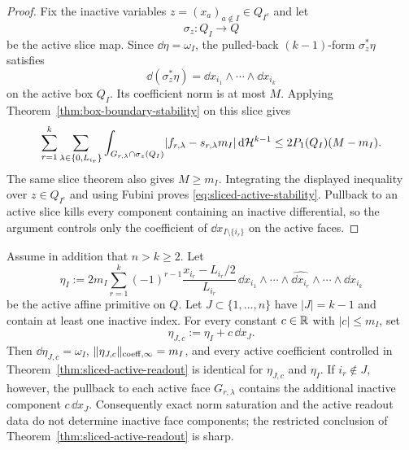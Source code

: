 \begin{proof}
Fix the inactive variables $z=(x_a)_{a\notin I}\in Q_{I^c}$ and let
\[
\sigma_z:Q_I\to Q
\]
be the active slice map. Since $\dd\eta=\omega_I$, the pulled-back
$(k-1)$-form $\sigma_z^\ast\eta$ satisfies
\[
\dd(\sigma_z^\ast\eta)=\dd x_{i_1}\wedge\cdots\wedge\dd x_{i_k}
\]
on the active box $Q_I$. Its coefficient norm is at most $M$. Applying
Theorem~\ref{thm:box-boundary-stability} on this slice gives
\[
\sum_{r=1}^k\sum_{\lambda\in\{0,L_{i_r}\}}
\int_{G_{r,\lambda}\cap\sigma_z(Q_I)}
\lvert f_{r,\lambda}-s_{r,\lambda}m_I \rvert\,\mathrm{d}\mathcal{H}^{k-1}
\le
2P_1(Q_I)(M-m_I).
\]
The same slice theorem also gives $M\ge m_I$. Integrating the displayed
inequality over $z\in Q_{I^c}$ and using Fubini proves
\eqref{eq:sliced-active-stability}. Pullback to an active slice kills every
component containing an inactive differential, so the argument controls only
the coefficient of $\dd x_{I\setminus\{i_r\}}$ on the active faces.
\end{proof}

\begin{proposition}
\label{prop:inactive-face-invisibility}
Assume in addition that $n>k\ge2$. Let
\[
\eta_I:=2m_I\sum_{r=1}^k(-1)^{r-1}
\frac{x_{i_r}-L_{i_r}/2}{L_{i_r}}\,
\dd x_{i_1}\wedge\cdots\wedge\widehat{\dd x_{i_r}}\wedge\cdots
\wedge\dd x_{i_k}
\]
be the active affine primitive on $Q$. Let $J\subset\{1,\dots,n\}$ have
$|J|=k-1$ and contain at least one inactive index. For every constant
$c\in\mathbb{R}$ with $|c|\le m_I$, set
\[
\eta_{J,c}:=\eta_I+c\,\dd x_J .
\]
Then $\dd\eta_{J,c}=\omega_I$,
$\lVert \eta_{J,c} \rVert_{\mathrm{coeff},\infty}=m_I$, and every active coefficient
controlled in Theorem~\ref{thm:sliced-active-readout} is identical for
$\eta_{J,c}$ and $\eta_I$. If $i_r\notin J$, however, the pullback to each
active face $G_{r,\lambda}$ contains the additional inactive component
$c\,\dd x_J$. Consequently exact norm saturation and the active readout data do
not determine inactive face components; the restricted conclusion of
Theorem~\ref{thm:sliced-active-readout} is sharp.
\end{proposition}

